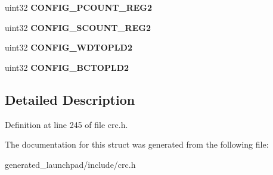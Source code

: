 \begin{DoxyCompactItemize}
\item 
\mbox{\label{structcrc__config__reg_a23b93a49eff24bcb12de87598c705551}} 
uint32 {\bfseries C\+O\+N\+F\+I\+G\+\_\+\+P\+C\+O\+U\+N\+T\+\_\+\+R\+E\+G2}
\item 
\mbox{\label{structcrc__config__reg_ab046bf6efd355f5a8e04f13f12c48762}} 
uint32 {\bfseries C\+O\+N\+F\+I\+G\+\_\+\+S\+C\+O\+U\+N\+T\+\_\+\+R\+E\+G2}
\item 
\mbox{\label{structcrc__config__reg_a45cc93574344d45052f592aa60d64778}} 
uint32 {\bfseries C\+O\+N\+F\+I\+G\+\_\+\+W\+D\+T\+O\+P\+L\+D2}
\item 
\mbox{\label{structcrc__config__reg_aca69cd87077b9591e2b6309e75f2edde}} 
uint32 {\bfseries C\+O\+N\+F\+I\+G\+\_\+\+B\+C\+T\+O\+P\+L\+D2}
\end{DoxyCompactItemize}


\subsection{Detailed Description}


Definition at line 245 of file crc.\+h.



The documentation for this struct was generated from the following file\+:\begin{DoxyCompactItemize}
\item 
generated\+\_\+launchpad/include/crc.\+h\end{DoxyCompactItemize}
